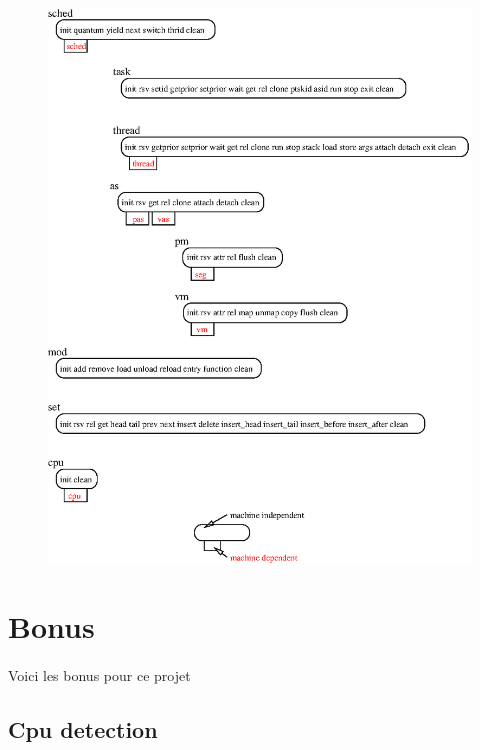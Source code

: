 \documentclass[10pt,a4wide]{article}
\begin{document}
\begin{figure}[h]
\centerline{\includegraphics{figures/interfaces.eps}}
\end{figure}

\section{Bonus}

\paragraph{}

Voici les bonus pour ce projet

\subsection{Cpu detection}

\paragraph{}
\end{document}
